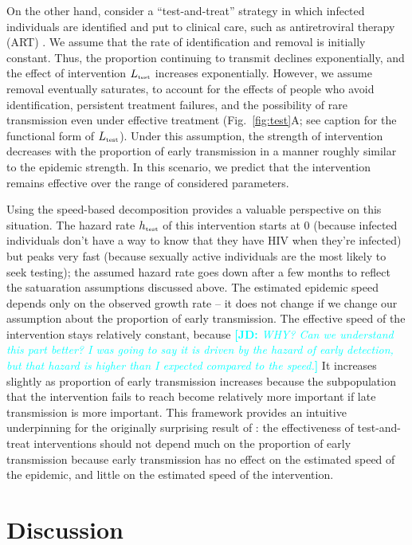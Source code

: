 \documentclass[12pt]{article}
\newcommand{\comment}[3]{\textcolor{#1}{\textbf{[#2: }\textit{#3}\textbf{]}}}
\newcommand{\jd}[1]{\comment{cyan}{JD}{#1}}
\newcommand{\tsub}[2]{#1_{{\textrm{\tiny #2}}}}
\newcommand{\figref}[1]{Fig.~\ref{fig:#1}}
\begin{document}
On the other hand, consider a ``test-and-treat'' strategy in which infected individuals are identified and put to clinical care, such as antiretroviral therapy (ART) \citep{garnett2009treating, nah2017test}.
We assume that the rate of identification and removal is initially constant.
Thus, the proportion continuing to transmit declines exponentially, and the effect of intervention $\tsub{L}{test}$ increases exponentially.
However, we assume removal eventually saturates, to account for the effects of people who avoid identification, persistent treatment failures, and the possibility of rare transmission even under effective treatment
(\figref{test}A; see caption for the functional form of $\tsub{L}{test}$).
Under this assumption, the strength of intervention decreases with the proportion of early transmission in a manner roughly similar to the epidemic strength.
In this scenario, we predict that the intervention remains effective over the range of considered parameters.

Using the speed-based decomposition provides a valuable perspective on this situation.
The hazard rate $\tsub{h}{test}$ of this intervention starts at 0 (because infected individuals don't have a way to know that they have HIV when they're infected) but peaks very fast (because sexually active individuals are the most likely to seek testing); 
the assumed hazard rate goes down after a few months to reflect the satuaration assumptions discussed above. 
The estimated epidemic speed depends only on the observed growth rate -- it does not change if we change our assumption about the proportion of early transmission.
The effective speed of the intervention stays relatively constant, because \jd{WHY? Can we understand this part better? I was going to say it is driven by the hazard of early detection, but that hazard is higher than I expected compared to the speed.}  It increases slightly as proportion of early transmission increases because the subpopulation that the intervention fails to reach become relatively more important if late transmission is more important.
This framework provides an intuitive underpinning for the originally surprising result of \cite{eaton2014proportion}: the effectiveness of test-and-treat interventions should not depend much on the proportion of early transmission because early transmission has no effect on the estimated speed of the epidemic, and little on the estimated speed of the intervention.

\section{Discussion}
\end{document}
